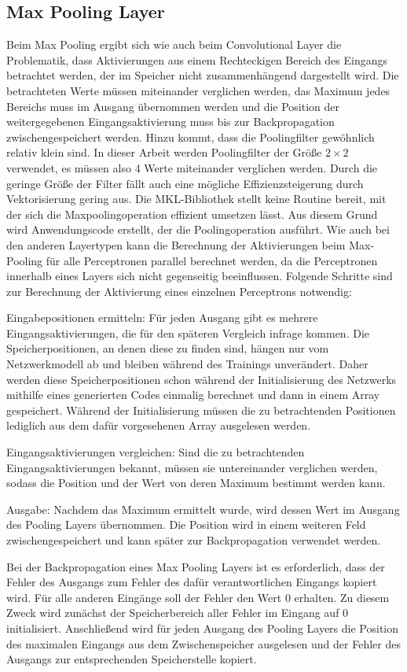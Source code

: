 \documentclass[../main.tex]{subfiles}
\begin{document}
\subsection{Max Pooling Layer}
Beim Max Pooling ergibt sich wie auch beim Convolutional Layer die Problematik, dass Aktivierungen aus einem Rechteckigen Bereich des Eingangs betrachtet werden, der im Speicher nicht zusammenhängend dargestellt wird. Die betrachteten Werte müssen miteinander verglichen werden, das Maximum jedes Bereichs muss im Ausgang übernommen werden und die Position der weitergegebenen Eingangsaktivierung muss bis zur Backpropagation zwischengespeichert werden. Hinzu kommt, dass die Poolingfilter gewöhnlich relativ klein sind. In dieser Arbeit werden Poolingfilter der Größe \(2\times2\) verwendet, es müssen also 4 Werte miteinander verglichen werden. Durch die geringe Größe der Filter fällt auch eine mögliche Effizienzsteigerung durch Vektorisierung gering aus. Die MKL-Bibliothek stellt keine Routine bereit, mit der sich die Maxpoolingoperation effizient umsetzen lässt. Aus diesem Grund wird Anwendungscode erstellt, der die Poolingoperation ausführt. Wie auch bei den anderen Layertypen kann die Berechnung der Aktivierungen beim Max-Pooling für alle Perceptronen parallel berechnet werden, da die Perceptronen innerhalb eines Layers sich nicht gegenseitig beeinflussen. Folgende Schritte sind zur Berechnung der Aktivierung eines einzelnen Perceptrons notwendig: 
\begin{description}
\item{Eingabepositionen ermitteln:} Für jeden Ausgang gibt es mehrere Eingangsaktivierungen, die für den späteren Vergleich infrage kommen. Die Speicherpositionen, an denen diese zu finden sind, hängen nur vom Netzwerkmodell ab und bleiben während des Trainings unverändert. Daher werden diese Speicherpositionen schon während der Initialisierung des Netzwerks mithilfe eines generierten Codes einmalig berechnet und dann in einem Array gespeichert. Während der Initialisierung müssen die zu betrachtenden Positionen lediglich aus dem dafür vorgesehenen Array ausgelesen werden. 
\item{Eingangsaktivierungen vergleichen:} Sind die zu betrachtenden Eingangsaktivierungen bekannt, müssen sie untereinander verglichen werden, sodass die Position und der Wert von deren Maximum bestimmt werden kann. 
\item{Ausgabe:} Nachdem das Maximum ermittelt wurde, wird dessen Wert im Ausgang des Pooling Layers übernommen. Die Position wird in einem weiteren Feld zwischengespeichert und kann später zur Backpropagation verwendet werden. 
\end{description}
Bei der Backpropagation eines Max Pooling Layers ist es erforderlich, dass der Fehler des Ausgangs zum Fehler des dafür verantwortlichen Eingangs kopiert wird. Für alle anderen Eingänge soll der Fehler den Wert 0 erhalten. Zu diesem Zweck wird zunächst der Speicherbereich aller Fehler im Eingang auf 0 initialisiert. Anschließend wird für jeden Ausgang des Pooling Layers die Position des maximalen Eingangs aus dem Zwischenspeicher ausgelesen und der Fehler des Ausgangs zur entsprechenden Speicherstelle kopiert. 
\end{document}
